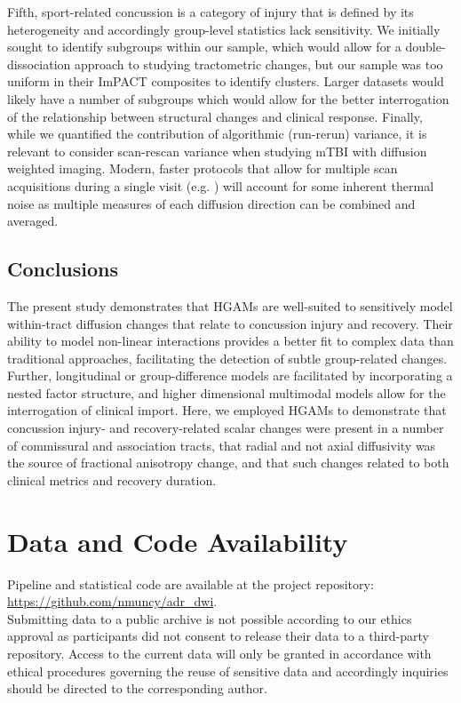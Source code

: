 \documentclass[12pt]{article}
\begin{document}
Fifth, sport-related concussion is a category of injury that is defined by its heterogeneity and accordingly group-level statistics lack sensitivity. We initially sought to identify subgroups within our sample, which would allow for a double-dissociation approach to studying tractometric changes, but our sample was too uniform in their ImPACT composites to identify clusters. Larger datasets would likely have a number of subgroups which would allow for the better interrogation of the relationship between structural changes and clinical response. Finally, while we quantified the contribution of algorithmic (run-rerun) variance, it is relevant to consider scan-rescan variance when studying mTBI with diffusion weighted imaging. Modern, faster protocols that allow for multiple scan acquisitions during a single visit (e.g. \cite{li2020EvaluationMultishellDiffusion}) will account for some inherent thermal noise as multiple measures of each diffusion direction can be combined and averaged.


\subsection{Conclusions}
\label{ssec:disc-conc}
The present study demonstrates that HGAMs are well-suited to sensitively model within-tract diffusion changes that relate to concussion injury and recovery. Their ability to model non-linear interactions provides a better fit to complex data than traditional approaches, facilitating the detection of subtle group-related changes. Further, longitudinal or group-difference models are facilitated by incorporating a nested factor structure, and higher dimensional multimodal models allow for the interrogation of clinical import. Here, we employed HGAMs to demonstrate that concussion injury- and recovery-related scalar changes were present in a number of commissural and association tracts, that radial and not axial diffusivity was the source of fractional anisotropy change, and that such changes related to both clinical metrics and recovery duration.


\section*{Data and Code Availability}
\label{sec:xtr-dca}
Pipeline and statistical code are available at the project repository: \url{https://github.com/nmuncy/adr_dwi}.\\

\noindent Submitting data to a public archive is not possible according to our ethics approval as participants did not consent to release their data to a third-party repository. Access to the current data will only be granted in accordance with ethical procedures governing the reuse of sensitive data and accordingly inquiries should be directed to the corresponding author.
\end{document}
